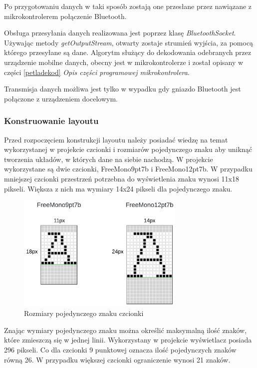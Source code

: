 \documentclass[a4paper,12pt, twoside]{article}
\begin{document}
    	Po przygotowaniu danych w taki sposób zostają one przesłane przez nawiązane z mikrokontrolerem połączenie Bluetooth.

    	Obsługa przesyłania danych realizowana jest poprzez klasę \textit{BluetoothSocket}. Używając metody \textit{getOutputStream}\cite{outputstream}, otwarty zostaje strumień wyjścia, za pomocą którego przesyłane są dane. Algorytm służący do dekodowania odebranych przez urządzenie mobilne danych, obecny jest w mikrokontrolerze i został opisany w części \ref{petladekod} \textit{Opis części programowej mikrokontrolera}.
    	
    	Transmisja danych możliwa jest tylko w wypadku gdy gniazdo Bluetooth jest połączone z urządzeniem docelowym.
	
    	\subsubsection{Konstruowanie layoutu}
    	Przed rozpoczęciem konstrukcji layoutu należy posiadać wiedzę na temat wykorzystanej w projekcie czcionki i rozmiarów pojedynczego znaku aby uniknąć tworzenia układów, w których dane na siebie nachodzą. W projekcie wykorzystane są dwie czcionki, FreeMono9pt7b i FreeMono12pt7b. W przypadku mniejszej czcionki przestrzeń potrzebna do wyświetlenia znaku wynosi 11x18 pikseli. Większa z nich ma wymiary 14x24 pikseli dla pojedynczego znaku.
    	\begin{figure}[H]
    	        \centering
    			\includegraphics[width=8cm]{images/rozmiarczcionek.png}
    			\caption{Rozmiary pojedynczego znaku czcionki}
                \label{fig:font}
    	\end{figure}
    	
    	Znając wymiary pojedynczego znaku można określić maksymalną ilość znaków, które zmieszczą się w jednej linii. Wykorzystany w projekcie wyświetlacz posiada 296 pikseli. Co dla czcionki 9 punktowej oznacza ilość pojedynczych znaków równą 26. W przypadku większej czcionki ograniczenie wynosi 21 znaków.
    	
\end{document}
